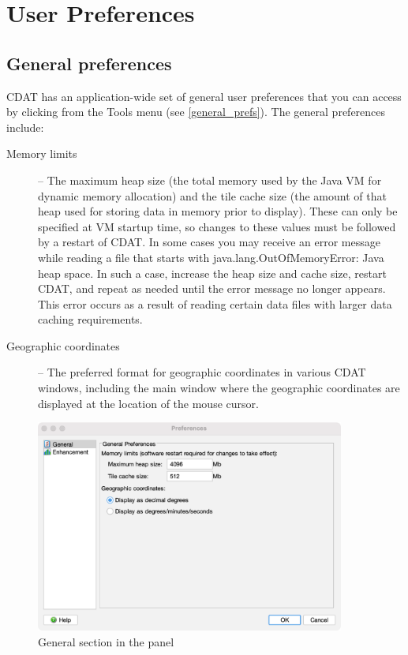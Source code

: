 \section{User Preferences}
\label{preferences}

\subsection{General preferences}

CDAT has an application-wide set of general user preferences that you can
access by clicking  from the {\gui Tools}
menu (see \autoref{general_prefs}).  The general preferences include:
\begin{description}

\item[Memory limits] -- The maximum heap size (the total memory used
by the Java VM for dynamic memory allocation) and the tile cache size (the
amount of that heap used for storing data in memory prior to display).  These
can only be specified at VM startup time, so changes to these values must be
followed by a restart of CDAT.  In some cases you may receive an error message
while reading a file that starts with {\file java.lang.OutOfMemoryError: Java
heap space}.  In such a case, increase the heap size and cache size, restart
CDAT, and repeat as needed until the error message no longer appears.  This
error occurs as a result of reading certain data files with larger data caching
requirements.

\item[Geographic coordinates] -- The preferred format for geographic
coordinates in various CDAT windows, including the main window where the
geographic coordinates are displayed at the location of the mouse cursor.

\end{description}

\begin{figure}
  \begin{center}
    \includegraphics[width=4in]{figures/cdat_general_prefs.png}
    \caption[General section in the Preferences panel]{
       {\gui General} section in the
        panel
    }
    \label{general_prefs}
  \end{center}
\end{figure}

